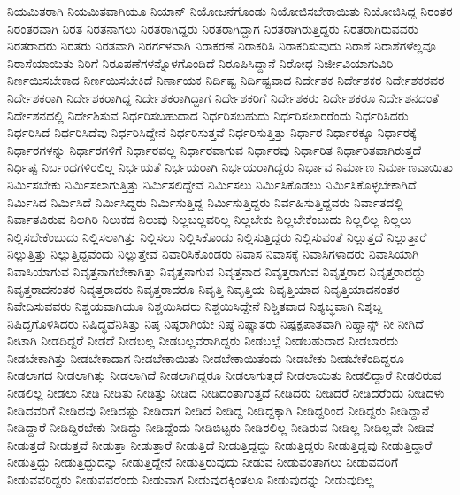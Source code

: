 {ನಿಯಮಿತರಾಗಿ
ನಿಯಮಿತವಾಗಿಯೂ
ನಿಯಾನ್
ನಿಯೋಜನೆಗೊಂಡು
ನಿಯೋಜಿಸಬೇಕಾಯಿತು
ನಿಯೋಜಿಸಿದ್ದ
ನಿರಂತರ
ನಿರಂತರವಾಗಿ
ನಿರತ
ನಿರತನಾಗಲು
ನಿರತರಾಗಿದ್ದರು
ನಿರತರಾಗಿದ್ದಾಗ
ನಿರತರಾಗಿರುತ್ತಿದ್ದರು
ನಿರತರಾಗಿರುವವರು
ನಿರತರಾದರು
ನಿರತರು
ನಿರತವಾಗಿ
ನಿರರ್ಗಳವಾಗಿ
ನಿರಾಕರಣೆ
ನಿರಾಕರಿಸಿ
ನಿರಾಕರಿಸುವುದು
ನಿರಾಶೆ
ನಿರಾಶೆಗಳೆಲ್ಲವೂ
ನಿರಾಸೆಯಾಯಿತು
ನಿರಿಗೆ
ನಿರೂಪಣೆಗಳನ್ನೊಳಗೊಂಡಿದೆ
ನಿರೂಪಿಸಿದ್ದಾನೆ
ನಿರೋಧ
ನಿರ್ಜೀವಿಯಾಗುವಿರಿ
ನಿರ್ಣಯಿಸಬೇಕಾದ
ನಿರ್ಣಯಿಸಬೇಕಿದೆ
ನಿರ್ಣಾಯಕ
ನಿರ್ದಿಷ್ಟ
ನಿರ್ದಿಷ್ಟವಾದ
ನಿರ್ದೇಶಕ
ನಿರ್ದೇಶಕರ
ನಿರ್ದೇಶಕರವರ
ನಿರ್ದೇಶಕರಾಗಿ
ನಿರ್ದೇಶಕರಾಗಿದ್ದ
ನಿರ್ದೇಶಕರಾಗಿದ್ದಾಗ
ನಿರ್ದೇಶಕರಿಗೆ
ನಿರ್ದೇಶಕರು
ನಿರ್ದೇಶಕರೂ
ನಿರ್ದೇಶನದಂತೆ
ನಿರ್ದೇಶನದಲ್ಲಿ
ನಿರ್ದೇಶಿಸುವ
ನಿರ್ಧರಿಸಬಹುದಾದ
ನಿರ್ಧರಿಸಬಹುದು
ನಿರ್ಧರಿಸಲಾರರೆಂದು
ನಿರ್ಧರಿಸಿದರು
ನಿರ್ಧರಿಸಿದೆ
ನಿರ್ಧರಿಸಿದೆವು
ನಿರ್ಧರಿಸಿದ್ದೇನೆ
ನಿರ್ಧರಿಸುತ್ತವೆ
ನಿರ್ಧರಿಸುತ್ತಿತ್ತು
ನಿರ್ಧಾರ
ನಿರ್ಧಾರಕ್ಕೂ
ನಿರ್ಧಾರಕ್ಕೆ
ನಿರ್ಧಾರಗಳನ್ನು
ನಿರ್ಧಾರಗಳಿಗೆ
ನಿರ್ಧಾರವಲ್ಲ
ನಿರ್ಧಾರವಾಗುವ
ನಿರ್ಧಾರವು
ನಿರ್ಧಾರಿತ
ನಿರ್ಧಾರಿತವಾಗಿರುತ್ತದೆ
ನಿರ್ಧಿಷ್ಟ
ನಿರ್ಬಂಧಗಳಿರಲಿಲ್ಲ
ನಿರ್ಭಯತೆ
ನಿರ್ಭಯರಾಗಿ
ನಿರ್ಭಯರಾಗಿದ್ದರು
ನಿರ್ಭಾವ
ನಿರ್ಮಾಣ
ನಿರ್ಮಾಣವಾಯಿತು
ನಿರ್ಮಿಸಬೇಕು
ನಿರ್ಮಿಸಲಾಗುತ್ತಿತ್ತು
ನಿರ್ಮಿಸಲಿದ್ದೇವೆ
ನಿರ್ಮಿಸಲು
ನಿರ್ಮಿಸಿಕೊಡಲು
ನಿರ್ಮಿಸಿಕೊಳ್ಳಬೇಕಾಗಿದೆ
ನಿರ್ಮಿಸಿದ
ನಿರ್ಮಿಸಿದೆ
ನಿರ್ಮಿಸಿದ್ದರು
ನಿರ್ಮಿಸುತ್ತಿದ್ದ
ನಿರ್ಮಿಸುತ್ತಿದ್ದರು
ನಿರ್ವಹಿಸುತ್ತಿದ್ದವರು
ನಿರ್ವಾತದಲ್ಲಿ
ನಿರ್ವಾತವಿರುವ
ನಿಲಗಿರಿ
ನಿಲುಕದ
ನಿಲುವು
ನಿಲ್ಲಬಲ್ಲವರಿಲ್ಲ
ನಿಲ್ಲಬೇಕು
ನಿಲ್ಲಬೇಕೆಂಬುದು
ನಿಲ್ಲಲಿಲ್ಲ
ನಿಲ್ಲಲು
ನಿಲ್ಲಿಸಬೇಕೆಂಬುದು
ನಿಲ್ಲಿಸಲಾಗಿತ್ತು
ನಿಲ್ಲಿಸಲು
ನಿಲ್ಲಿಸಿಕೊಂಡು
ನಿಲ್ಲಿಸುತ್ತಿದ್ದರು
ನಿಲ್ಲಿಸುವಂತೆ
ನಿಲ್ಲುತ್ತದೆ
ನಿಲ್ಲುತ್ತಾರೆ
ನಿಲ್ಲುತ್ತಿತ್ತು
ನಿಲ್ಲುತ್ತಿದ್ದವೆಂದು
ನಿಲ್ಲುತ್ತೇವೆ
ನಿವಾರಿಸಿಕೊಂಡರು
ನಿವಾಸ
ನಿವಾಸಕ್ಕೆ
ನಿವಾಸಿಗಳಾದರು
ನಿವಾಸಿಯಾಗಿ
ನಿವಾಸಿಯಾಗುವ
ನಿವೃತ್ತನಾಗಬೇಕಾಗಿತ್ತು
ನಿವೃತ್ತನಾಗುವ
ನಿವೃತ್ತನಾದ
ನಿವೃತ್ತರಾಗುವ
ನಿವೃತ್ತರಾದ
ನಿವೃತ್ತರಾದದ್ದು
ನಿವೃತ್ತರಾದನಂತರ
ನಿವೃತ್ತರಾದರು
ನಿವೃತ್ತರಾದರೂ
ನಿವೃತ್ತಿ
ನಿವೃತ್ತಿಯ
ನಿವೃತ್ತಿಯಾದ
ನಿವೃತ್ತಿಯಾದನಂತರ
ನಿವೇದಿಸುವವರು
ನಿಶ್ಚಯವಾಗಿಯೂ
ನಿಶ್ಚಯಿಸಿದರು
ನಿಶ್ಚಯಿಸಿದ್ದೇನೆ
ನಿಶ್ಚಿತವಾದ
ನಿಶ್ಯಬ್ಧವಾಗಿ
ನಿಶ್ಶಬ್ದ
ನಿಷಿದ್ದಗೊಳಿಸಿದರು
ನಿಷಿದ್ಧವೆನಿಸಿತ್ತು
ನಿಷ್ಠ
ನಿಷ್ಠರಾಗಿಯೇ
ನಿಷ್ಠೆ
ನಿಷ್ಣಾತರು
ನಿಷ್ಪಕ್ಷಪಾತವಾಗಿ
ನಿಹ್ಹಾನ್ಸ್
ನೀ
ನೀಗಿದೆ
ನೀಟಾಗಿ
ನೀಡದಿದ್ದರೆ
ನೀಡದೆ
ನೀಡಬಲ್ಲ
ನೀಡಬಲ್ಲವರಾಗಿದ್ದರು
ನೀಡಬಲ್ಲೆ
ನೀಡಬಹುದಾದ
ನೀಡಬಾರದು
ನೀಡಬೇಕಾಗಿತ್ತು
ನೀಡಬೇಕಾದಾಗ
ನೀಡಬೇಕಾಯಿತು
ನೀಡಬೇಕಾಯಿತೆಂದು
ನೀಡಬೇಕು
ನೀಡಬೇಕೆಂದಿದ್ದರೂ
ನೀಡಲಾಗದ
ನೀಡಲಾಗಿತ್ತು
ನೀಡಲಾಗಿದೆ
ನೀಡಲಾಗಿದ್ದರೂ
ನೀಡಲಾಗುತ್ತದೆ
ನೀಡಲಾಯಿತು
ನೀಡಲಿದ್ದಾರೆ
ನೀಡಲಿರುವ
ನೀಡಲಿಲ್ಲ
ನೀಡಲು
ನೀಡಿ
ನೀಡಿತು
ನೀಡಿತ್ತು
ನೀಡಿದ
ನೀಡಿದಂತಾಗುತ್ತದೆ
ನೀಡಿದರು
ನೀಡಿದರೆ
ನೀಡಿದರೆಂದು
ನೀಡಿದಳು
ನೀಡಿದವರಿಗೆ
ನೀಡಿದವು
ನೀಡಿದಷ್ಟು
ನೀಡಿದಾಗ
ನೀಡಿದೆ
ನೀಡಿದ್ದ
ನೀಡಿದ್ದಕ್ಕಾಗಿ
ನೀಡಿದ್ದರಿಂದ
ನೀಡಿದ್ದರು
ನೀಡಿದ್ದಾನೆ
ನೀಡಿದ್ದಾರೆ
ನೀಡಿದ್ದಿರಬೇಕು
ನೀಡಿದ್ದು
ನೀಡಿದ್ದೆಂದು
ನೀಡಿಬಿಟ್ಟರು
ನೀಡಿರಲಿಲ್ಲ
ನೀಡಿರುವ
ನೀಡಿಲ್ಲ
ನೀಡಿಲ್ಲವೇ
ನೀಡಿವೆ
ನೀಡುತ್ತದೆ
ನೀಡುತ್ತವೆ
ನೀಡುತ್ತಾ
ನೀಡುತ್ತಾರೆ
ನೀಡುತ್ತಿದೆ
ನೀಡುತ್ತಿದ್ದದ್ದು
ನೀಡುತ್ತಿದ್ದರು
ನೀಡುತ್ತಿದ್ದವು
ನೀಡುತ್ತಿದ್ದಾರೆ
ನೀಡುತ್ತಿದ್ದು
ನೀಡುತ್ತಿದ್ದುದನ್ನು
ನೀಡುತ್ತಿದ್ದೇನೆ
ನೀಡುತ್ತಿರುವುದು
ನೀಡುವ
ನೀಡುವಂತಾಗಲು
ನೀಡುವವರಿಗೆ
ನೀಡುವವರಿದ್ದರು
ನೀಡುವವರೆಂದು
ನೀಡುವಾಗ
ನೀಡುವುದಕ್ಕಿಂತಲೂ
ನೀಡುವುದನ್ನು
ನೀಡುವುದಿಲ್ಲ
}
